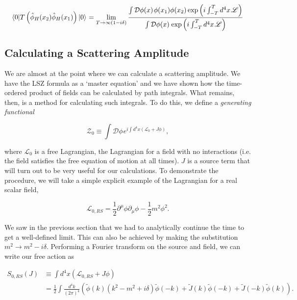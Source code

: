 \begin{equation}
 \mathinner{\langle0\vert T \left(\hat{\phi}_H(x_2) \hat{\phi}_H(x_1) \right)\vert0\rangle}_{} = \lim_{T \to \infty(1 - i \delta)} \frac{\int  \mathcal{D} \phi(x) \hspace{1pt}  \phi(x_1) \phi(x_2) \exp \left( i \int_{-T}^T d^4 x \hspace{1pt} \mathscr{L} \right)}{\int  \mathcal{D} \phi(x) \hspace{1pt} \exp \left( i \int_{-T}^T d^4 x \hspace{1pt} \mathscr{L} \right)}
\end{equation}

\subsection{Calculating a Scattering Amplitude}

We are almost at the point where we can calculate a scattering amplitude. We have the LSZ formula as a `master equation' and we have shown how the time-ordered product of fields can be calculated by path integrals. What remains, then, is a method for calculating such integrals. To do this, we define a \emph{generating functional}

\begin{equation}
\mathcal{Z}_0 \equiv \int \mathcal{D} \phi \hspace{1pt} e^{i \int d^4x (\mathscr{L}_0 + J \phi)},
\end{equation}

where $\mathscr{L}_0$ is a free Lagrangian, the Lagrangian for a field with no interactions (i.e. the field satisfies the free equation of motion at all times). $J$ is a source term that will turn out to be very useful for our calculations. To demonstrate the procedure, we will take a simple explicit example of the Lagrangian for a real scalar field,

\begin{equation}
\mathscr{L}_{0,RS} = \frac{1}{2}\partial^\mu \phi \partial_\mu \phi - \frac{1}{2} m^2 \phi^2.
\end{equation} 

We saw in the previous section that we had to analytically continue the time to get a well-defined limit. This can also be achieved by making the substitution $m^2 \to m^2 - i \delta$. Performing a Fourier transform on the source and field, we can write our free action as

\begin{equation}
\begin{split}
S_{0,RS}(J) & \equiv \int d^4 x (\mathscr{L}_{0,RS} + J \phi) \\
&= \frac{1}{2} \int \frac{d^4k}{(2 \pi)^4} \left(\tilde{\phi}(k)(k^2 - m^2 + i \delta) \tilde{\phi}(-k) + \tilde{J}(k) \tilde{\phi}(-k) + \tilde{J}(-k)\tilde{\phi}(k) \right).
\end{split}
\end{equation}

